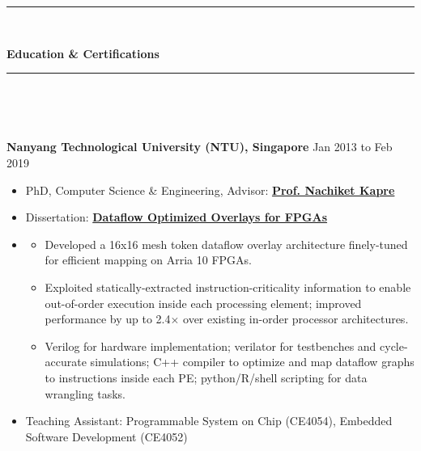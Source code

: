 \documentclass[10pt]{article}
\newenvironment{innerlist}[1][\enskip\textbullet]%
        {\begin{itemize}[#1,leftmargin=*,parsep=0pt,itemsep=0pt,topsep=0pt,partopsep=0pt]}
        {\end{itemize}}
\newenvironment{myinnerlist}[1][\enskip\textbullet]%
        {\begin{itemize}[#1,leftmargin=*,parsep=0pt,itemsep=3pt,topsep=0pt,partopsep=0pt]}
        {\end{itemize}\vspace{.6\baselineskip}}
\newcommand{\localtextbulletone}{\textcolor{gray}{\raisebox{.45ex}{\rule{.8ex}{.8ex}}}}
\begin{document}
{
    \hspace*{-\marginparsep minus \marginparwidth}%
    \begin{minipage}[t]{\textwidth+\marginparwidth+\marginparsep}%
         \rule{\columnwidth}{1pt}\\[-1.4\baselineskip]%
         \begin{center}{\large \bfseries Education \& Certifications}\end{center}
         \vspace{-0.18in}
         \rule{\columnwidth}{1pt}\\[-1.4\baselineskip]%
     \end{minipage}}\\[.5\baselineskip]

{
    \hspace*{-\marginparsep minus \marginparwidth}%
    \begin{minipage}[t]{\textwidth+\marginparwidth+\marginparsep}%

        {\textbf{Nanyang Technological University (NTU), Singapore}} \hfill {Jan 2013 to Feb 2019}

        \vspace{0.1in}
        \begin{innerlist}
            \item[] PhD, {Computer Science \& Engineering},
                Advisor: \href{https://nachiket.github.io/}{\bf Prof. Nachiket Kapre}
            \item[] Dissertation: \href{https://dr.ntu.edu.sg/handle/10220/47803}{\bf Dataflow Optimized Overlays for FPGAs}
            \item[]
                \begin{myinnerlist}
                \renewcommand{\labelitemi}{\localtextbulletone}
                \item Developed a 16x16 mesh token dataflow overlay
                    architecture finely-tuned for efficient mapping on Arria 10
                    FPGAs.
                \item Exploited statically-extracted instruction-criticality
                    information to enable out-of-order execution inside each
                    processing element; improved performance by up to
                    2.4$\times$ over existing in-order processor architectures.
                \item Verilog for hardware implementation; verilator for
                    testbenches and cycle-accurate simulations; C++ compiler to
                    optimize and map dataflow graphs to instructions inside
                    each PE; python/R/shell scripting for data wrangling tasks.
            \end{myinnerlist}
            \vspace{-0.06in}
            \item[] Teaching Assistant: Programmable System on Chip (CE4054), Embedded Software Development (CE4052)
        \end{innerlist}


\end{minipage}}
\end{document}
